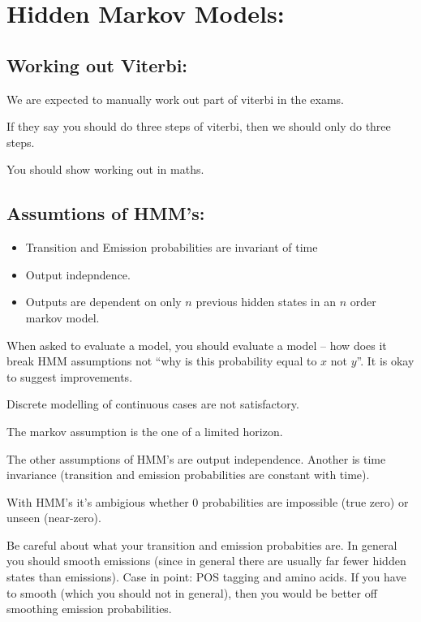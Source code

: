 \documentclass[10pt,\jkfside,a4paper]{article}
\begin{document}
\section*{Hidden Markov Models:}

\subsection*{Working out Viterbi:}

We are expected to manually work out part of viterbi in the exams.

If they say you should do three steps of viterbi, then we should only 
do three steps.

You should show working out in maths.

\subsection*{Assumtions of HMM's:}

\begin{itemize}

\item Transition and Emission probabilities are invariant of time

\item Output indepndence.

\item Outputs are dependent on only $n$ previous hidden states in an $n$ order markov model.

\end{itemize}

When asked to evaluate a model, you should evaluate a model -- how does it break HMM 
assumptions not ``why is this probability equal to $x$ not $y$''. It is okay to suggest 
improvements.

Discrete modelling of continuous cases are not satisfactory.


The markov assumption is the one of a limited horizon.

The other assumptions of HMM's are output independence. Another is 
time invariance (transition and emission probabilities are constant with time).

With HMM's it's ambigious whether 0 probabilities are impossible (true zero) or unseen (near-zero).

Be careful about what your transition and emission probabities are. In general you should 
smooth emissions (since in general there are usually far fewer hidden states than emissions). 
Case in point: POS tagging and amino acids. If you have to smooth (which you should not in general), 
then you would be better off smoothing emission probabilities.
\end{document}
